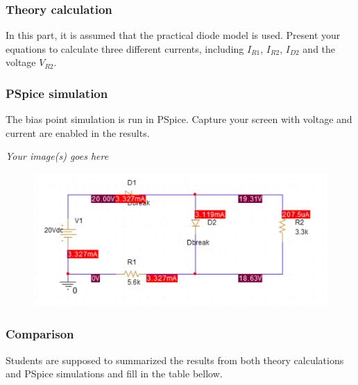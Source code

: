 \subsubsection{Theory calculation}
In this part, it is assumed that the practical diode model is used. Present your equations to calculate three different currents, including $I_{R1}$, $I_{R2}$, $I_{D2}$ and the voltage $V_{R2}$.

\dotfill\bigskip\par\mbox{}\dotfill
\dotfill\bigskip\par\mbox{}\dotfill
\dotfill\bigskip\par\mbox{}\dotfill
\dotfill\bigskip\par\mbox{}\dotfill

\subsubsection{PSpice simulation}
The bias point simulation is run in PSpice. Capture your screen with voltage and current are enabled in the results.

\textit{Your image(s) goes here}\\
\begin{figure}[!htp]
    \centering
    \includegraphics[width = 500px]{source/picture/bai_2/sim_ex4.png}
\end{figure}

\vspace{8cm}

\subsubsection{Comparison}

Students are supposed to summarized the results from both theory calculations and PSpice simulations and fill in the table bellow.\\

